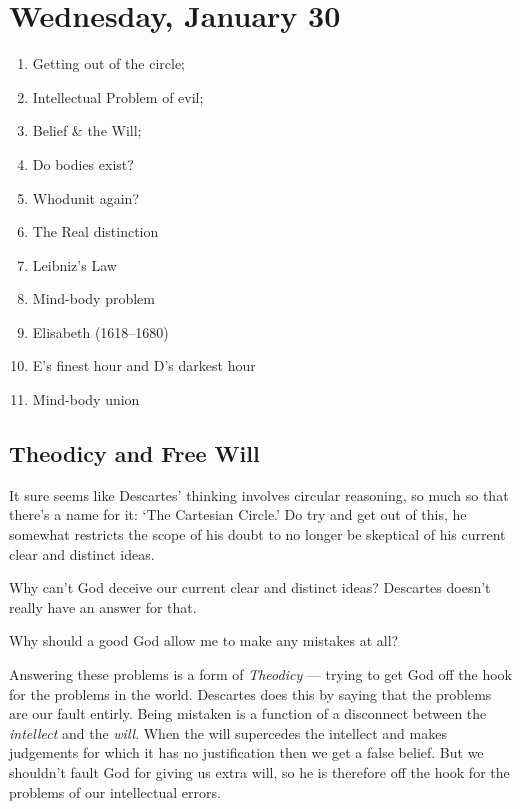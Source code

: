 
\section{Wednesday, January 30}

\begin{multicols}{2}
\begin{enumerate}
\item Getting out of the circle;
\item Intellectual Problem of evil;
\item Belief \& the Will;
\item Do bodies exist?
\item Whodunit again?
\item The Real distinction
\item Leibniz's Law
\item Mind-body problem
\item Elisabeth (1618--1680)
\item E's finest hour and D's darkest hour
\item Mind-body union
\end{enumerate}
\end{multicols}

\subsection{Theodicy and Free Will}

It sure seems like Descartes' thinking involves circular reasoning, so much so that there's a name for it: `The Cartesian Circle.' Do try and get out of this, he somewhat restricts the scope of his doubt to no longer be skeptical of his current clear and distinct ideas.

\begin{problem}
Why can't God deceive our current clear and distinct ideas? Descartes doesn't really have an answer for that.
\end{problem}

\begin{problem}
Why should a good God allow me to make any mistakes at all?
\end{problem}

Answering these problems is a form of \emph{Theodicy} --- trying to get God off the hook for the problems in the world. Descartes does this by saying that the problems are our fault entirly. Being mistaken is a function of a disconnect between the \emph{intellect} and the \emph{will}. When the will supercedes the intellect and makes judgements for which it has no justification then we get a false belief. But we shouldn't fault God for giving us extra will, so he is therefore off the hook for the problems of our intellectual errors.

